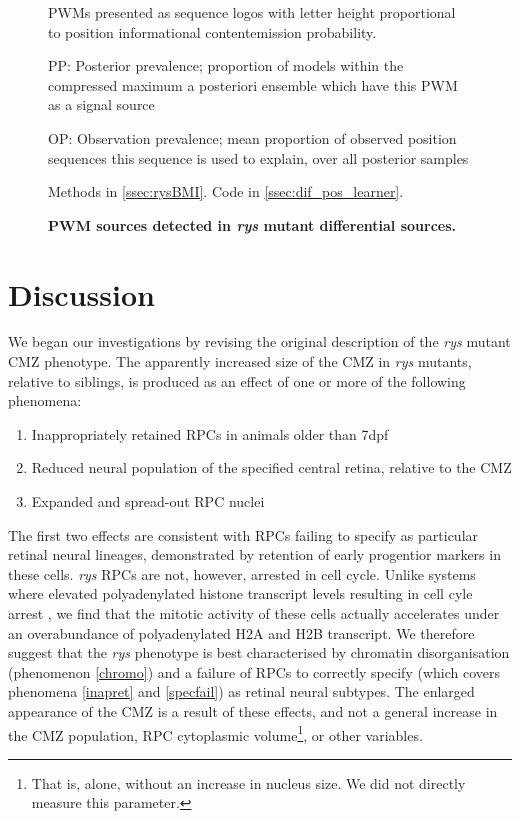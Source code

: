 \begin{figure}[!h]
    \caption{{\bf PWM sources detected in \textit{rys} mutant differential sources.}}
    PWMs presented as sequence logos with letter height proportional to position informational content\/emission probability.
    
    PP: Posterior prevalence; proportion of models within the compressed maximum a posteriori ensemble which have this PWM as a signal source

    OP: Observation prevalence; mean proportion of observed position sequences this sequence is used to explain, over all posterior samples
    
    Methods in \autoref{ssec:rysBMI}.
    Code in \autoref{ssec:dif_pos_learner}.
    \label{rysmotifs}
\end{figure}

\FloatBarrier

\section{Discussion}
We began our investigations by revising the original description of the \textit{rys} mutant CMZ phenotype. The apparently increased size of the CMZ in \textit{rys} mutants, relative to siblings, is produced as an effect of one or more of the following phenomena:

\begin{enumerate}
\item\label{inapret} Inappropriately retained RPCs in animals older than 7dpf
\item\label{specfail} Reduced neural population of the specified central retina, relative to the CMZ
\item\label{chromo} Expanded and spread-out RPC nuclei
\end{enumerate}

The first two effects are consistent with RPCs failing to specify as particular retinal neural lineages, demonstrated by retention of early progentior markers in these cells. \textit{rys} RPCs are not, however, arrested in cell cycle. Unlike systems where elevated polyadenylated histone transcript levels resulting in cell cyle arrest \cite{Kari2013}, we find that the mitotic activity of these cells actually accelerates under an overabundance of polyadenylated H2A and H2B transcript. We therefore suggest that the \textit{rys} phenotype is best characterised by chromatin disorganisation (phenomenon \ref{chromo}) and a failure of RPCs to correctly specify (which covers phenomena \ref{inapret} and \ref{specfail}) as retinal neural subtypes. The enlarged appearance of the CMZ is a result of these effects, and not a general increase in the CMZ population, RPC cytoplasmic volume\footnote{That is, alone, without an increase in nucleus size. We did not directly measure this parameter.}, or other variables. 

